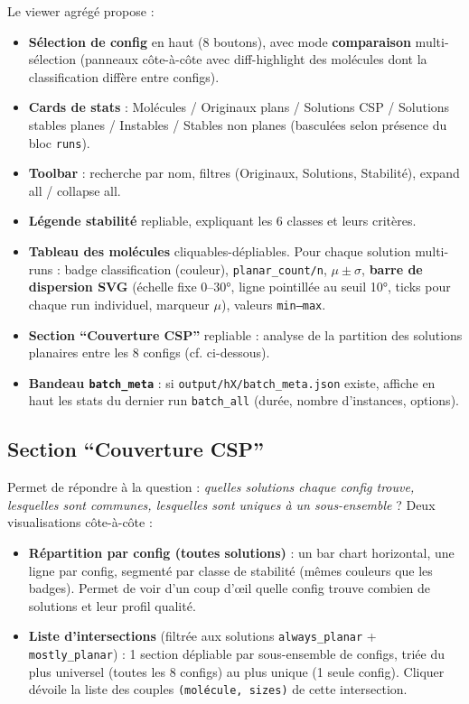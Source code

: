 Le viewer agrégé propose :
\begin{itemize}
  \item \textbf{Sélection de config} en haut (8 boutons), avec mode \textbf{comparaison}
    multi-sélection (panneaux côte-à-côte avec diff-highlight des molécules dont la
    classification diffère entre configs).
  \item \textbf{Cards de stats} : Molécules / Originaux plans / Solutions CSP / Solutions
    stables planes / Instables / Stables non planes (basculées selon présence du bloc
    \texttt{runs}).
  \item \textbf{Toolbar} : recherche par nom, filtres (Originaux, Solutions, Stabilité),
    expand all / collapse all.
  \item \textbf{Légende stabilité} repliable, expliquant les 6 classes et leurs critères.
  \item \textbf{Tableau des molécules} cliquables-dépliables. Pour chaque solution
    multi-runs : badge classification (couleur), \texttt{planar\_count/n}, $\mu \pm \sigma$,
    \textbf{barre de dispersion SVG} (échelle fixe 0--30°, ligne pointillée au seuil 10°,
    ticks pour chaque run individuel, marqueur $\mu$), valeurs \texttt{min--max}.
  \item \textbf{Section ``Couverture CSP''} repliable : analyse de la partition des solutions
    planaires entre les 8 configs (cf. ci-dessous).
  \item \textbf{Bandeau \texttt{batch\_meta}} : si \texttt{output/hX/batch\_meta.json}
    existe, affiche en haut les stats du dernier run \texttt{batch\_all} (durée, nombre
    d'instances, options).
\end{itemize}

\subsection{Section ``Couverture CSP''}

Permet de répondre à la question : \emph{quelles solutions chaque config trouve, lesquelles
sont communes, lesquelles sont uniques à un sous-ensemble} ? Deux visualisations côte-à-côte :

\begin{itemize}
  \item \textbf{Répartition par config (toutes solutions)} : un bar chart horizontal, une
    ligne par config, segmenté par classe de stabilité (mêmes couleurs que les badges).
    Permet de voir d'un coup d'\oe{}il quelle config trouve combien de solutions et leur
    profil qualité.
  \item \textbf{Liste d'intersections} (filtrée aux solutions \texttt{always\_planar} +
    \texttt{mostly\_planar}) : 1 section dépliable par sous-ensemble de configs, triée du
    plus universel (toutes les 8 configs) au plus unique (1 seule config). Cliquer dévoile
    la liste des couples \texttt{(molécule, sizes)} de cette intersection.
\end{itemize}

